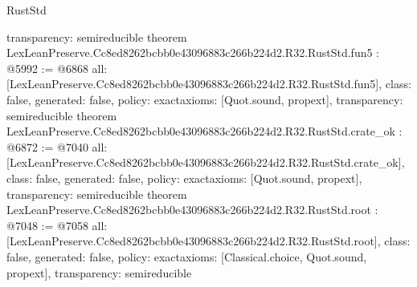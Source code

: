 \begin{lexlean}{RustStd}
\begin{coremodule}
{  transparency: semireducible
}
theorem LexLeanPreserve.Cc8ed8262bcbb0e43096883c266b224d2.R32.RustStd.fun5 : @5992 := @6868 {
  all: [LexLeanPreserve.Cc8ed8262bcbb0e43096883c266b224d2.R32.RustStd.fun5],
  class: false,
  generated: false,
  policy: exact{axioms: [Quot.sound, propext]},
  transparency: semireducible
}
theorem LexLeanPreserve.Cc8ed8262bcbb0e43096883c266b224d2.R32.RustStd.crate_ok : @6872 := @7040 {
  all: [LexLeanPreserve.Cc8ed8262bcbb0e43096883c266b224d2.R32.RustStd.crate_ok],
  class: false,
  generated: false,
  policy: exact{axioms: [Quot.sound, propext]},
  transparency: semireducible
}
theorem LexLeanPreserve.Cc8ed8262bcbb0e43096883c266b224d2.R32.RustStd.root : @7048 := @7058 {
  all: [LexLeanPreserve.Cc8ed8262bcbb0e43096883c266b224d2.R32.RustStd.root],
  class: false,
  generated: false,
  policy: exact{axioms: [Classical.choice, Quot.sound, propext]},
  transparency: semireducible
}


\end{coremodule}
\end{lexlean}
